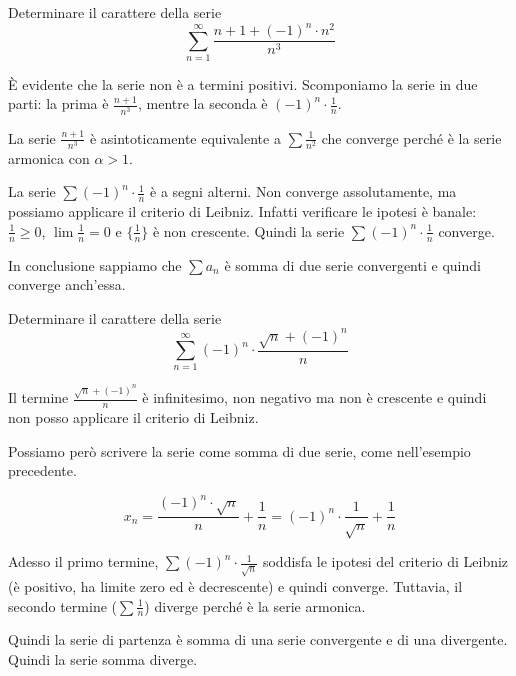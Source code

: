\begin{example}
Determinare il carattere della serie
\begin{equation*}
\sum_{n=1}^\infty \frac{n + 1 + (-1)^n \cdot n^2}{n^3}
\end{equation*}

È evidente che la serie non è a termini positivi. Scomponiamo la serie in due parti: la prima è $\frac{n+1}{n^3}$, mentre la seconda è $(-1)^n \cdot \frac{1}{n}$.

La serie $\frac{n+1}{n^3}$ è asintoticamente equivalente a $\sum \frac{1}{n^2}$ che converge perché è la serie armonica con $\alpha > 1$.

La serie $\sum (-1)^n \cdot \frac{1}{n}$ è a segni alterni. Non converge assolutamente, ma possiamo applicare il criterio di Leibniz. Infatti verificare le ipotesi è banale: $\frac{1}{n} \ge 0$, $\lim \frac{1}{n} = 0$ e $\{\frac{1}{n}\}$ è non crescente. Quindi la serie $\sum (-1)^n \cdot \frac{1}{n}$ converge.

In conclusione sappiamo che $\sum a_n$ è somma di due serie convergenti e quindi converge anch'essa.
\end{example}

\begin{example}
Determinare il carattere della serie
\begin{equation*}
\sum_{n=1}^\infty (-1)^n \cdot \frac{\sqrt{n} + (-1)^n}{n}
\end{equation*}

Il termine $\frac{\sqrt{n} + (-1)^n}{n}$ è infinitesimo, non negativo ma non è crescente e quindi non posso applicare il criterio di Leibniz. 

Possiamo però scrivere la serie come somma di due serie, come nell'esempio precedente.

\begin{equation*}
x_n = \frac{(-1)^n \cdot \sqrt{n}}{n} + \frac{1}{n} = (-1)^n \cdot \frac{1}{\sqrt{n}} + \frac{1}{n}
\end{equation*}

Adesso il primo termine, $\sum (-1)^n \cdot \frac{1}{\sqrt{n}}$ soddisfa le ipotesi del criterio di Leibniz (è positivo, ha limite zero ed è decrescente) e quindi converge. Tuttavia, il secondo termine ($\sum \frac{1}{n}$) diverge perché è la serie armonica.

Quindi la serie di partenza è somma di una serie convergente e di una divergente. Quindi la serie somma diverge. 
\end{example}
